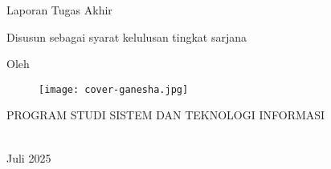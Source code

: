 \clearpage
\pagestyle{empty}

\begin{center}
	\smallskip

	\fontsize{16}{19.2}\selectfont\bfseries {\thetitle}
	\vfill

	\Large Laporan Tugas Akhir
	\vfill

	\large Disusun sebagai syarat kelulusan tingkat sarjana
	\vfill

	\large Oleh

	\Large \theauthor

	\vfill
	\begin{figure}[ht]
		\centering
		\texttt{[image: cover-ganesha.jpg]}
	\end{figure}
	\vfill

	\large
	\uppercase{
		Program Studi Sistem dan Teknologi Informasi \\
		\MakeUppercase{\steifull \\ \itbfull}
	}

	Juli 2025

\end{center}

\clearpage
